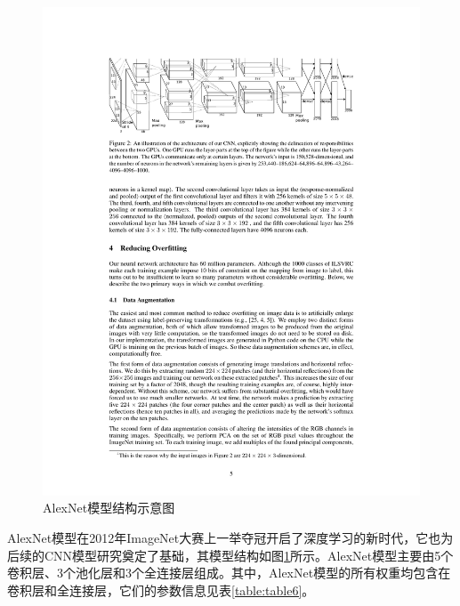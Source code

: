 \begin{figure}[htbp]
    \centering
    \includegraphics[width=1.0\textwidth]{figures/alexnet.pdf}
    \caption{AlexNet模型结构示意图 \cite{krizhevsky2012imagenet}}\label{figure:figure17}
\end{figure}

AlexNet模型在2012年ImageNet大赛上一举夺冠开启了深度学习的新时代，它也为后续的CNN模型研究奠定了基础，其模型结构如图\ref{figure:figure17}所示。AlexNet模型主要由5个卷积层、3个池化层和3个全连接层组成。其中，AlexNet模型的所有权重均包含在卷积层和全连接层，它们的参数信息见表\ref{table:table6}。

